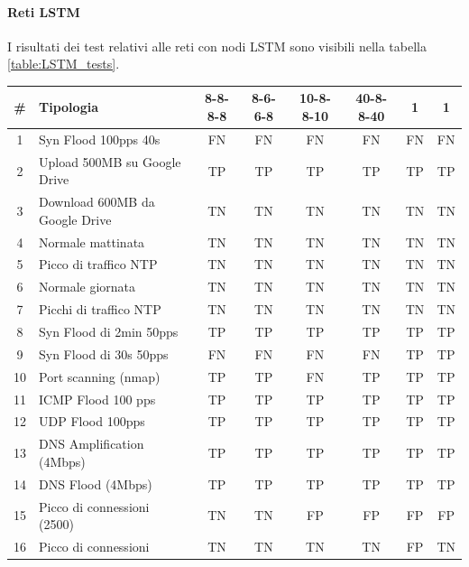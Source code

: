 \paragraph{Reti LSTM} I risultati dei test relativi alle reti con nodi LSTM sono visibili nella tabella \ref{table:LSTM_tests}.


\begin{table}
    \begin{tabularx}{\textwidth}{||c X c c c c c c||} 
        \hline
        \# & Tipologia & 8-8-8-8 & 8-6-6-8 & 10-8-8-10 & 40-8-8-40 & 1& 1\\ [0.5ex] 
        \hline\hline
        1 & Syn Flood 100pps 40s & FN & FN & FN & FN & FN & FN \\ 
        \hline
        2 & Upload 500MB su Google Drive & TP & TP & TP & TP & TP & TP  \\ 
        \hline
        3 &  Download 600MB da Google Drive & TN  & TN & TN & TN & TN & TN \\ 
        \hline 
        4 & Normale mattinata & TN & TN & TN & TN & TN & TN \\
        \hline
        5 & Picco di traffico NTP & TN & TN & TN & TN & TN & TN \\
        \hline
        6 & Normale giornata & TN & TN & TN & TN & TN & TN \\ 
        \hline
        7 & Picchi di traffico NTP & TN & TN & TN & TN & TN & TN  \\ 
        \hline 
        8 & Syn Flood di 2min 50pps & TP & TP & TP & TP & TP & TP \\
        \hline
        9 & Syn Flood di 30s 50pps & FN & FN & FN & FN & TP & TP  \\        
        \hline
        10 & Port scanning (nmap) & TP & TP & FN & TP & TP & TP   \\
        \hline
        11 & ICMP Flood 100 pps & TP & TP & TP & TP & TP & TP \\
        \hline
        12 & UDP Flood 100pps & TP & TP & TP & TP & TP & TP \\ 
        \hline
        13 & DNS Amplification (4Mbps) & TP & TP & TP & TP & TP & TP \\ 
        \hline 
        14 & DNS Flood (4Mbps) & TP & TP & TP & TP & TP & TP \\
        \hline
        15 & Picco di connessioni (2500) & TN & TN & FP & FP & FP & FP\\        
        \hline 
        16 & Picco di connessioni & TN & TN & TN & TN & FP & TN\\        

\end{tabularx}
\end{table}
